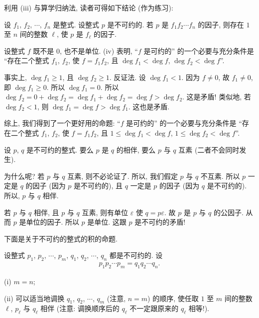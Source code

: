 \begin{remark}
    利用 (iii) 与算学归纳法, 读者可得如下结论 (作为练习):

    设 $f_1$, $f_2$, $\cdots$, $f_n$ 是整式. 设整式 $p$ 是不可约的. 若 $p$ 是 $f_1 f_2 \cdots f_n$ 的因子, 则存在 $1$ 至 $n$ 间的整数 $\ell$, 使 $p$ 是 $f_{\ell}$ 的因子.
\end{remark}

\begin{remark}
    设整式 $f$ 既不是 $0$, 也不是单位. (iv) 表明, ``$f$ 是可约的'' 的一个必要与充分条件是 ``存在二个整式 $f_1$, $f_2$, 使 $f = f_1 f_2$, 且 $\deg f_1 < \deg f$, $\deg f_2 < \deg f$''.

    事实上, $\deg f_1 \geq 1$, 且 $\deg f_2 \geq 1$. 反证法. 设 $\deg f_1 < 1$. 因为 $f \neq 0$, 故 $f_1 \neq 0$, 即 $\deg f_1 \geq 0$. 所以 $\deg f_1 = 0$. 所以 $\deg f_2 = 0 + \deg f_2 = \deg f_1 + \deg f_2 = \deg f > \deg f_2$. 这是矛盾! 类似地, 若 $\deg f_2 < 1$, 则 $\deg f_1 = \deg f > \deg f_1$. 这也是矛盾.

    综上, 我们得到了一个更好用的命题: ``$f$ 是可约的'' 的一个必要与充分条件是 ``存在二个整式 $f_1$, $f_2$, 使 $f = f_1 f_2$, 且 $1 \leq \deg f_1 < \deg f$, $1 \leq \deg f_2 < \deg f$''.
\end{remark}

\begin{remark}
    设 $p$, $q$ 是不可约的整式. 要么 $p$ 是 $q$ 的相伴, 要么 $p$ 与 $q$ 互素 (二者不会同时发生).

    为什么呢? 若 $p$ 与 $q$ 互素, 则不必论证了. 所以, 我们假定 $p$ 与 $q$ 不互素. 所以 $p$ 一定是 $q$ 的因子 (因为 $p$ 是不可约的), 且 $q$ 一定是 $p$ 的因子 (因为 $q$ 是不可约的). 所以, $p$ 与 $q$ 相伴.

    若 $p$ 与 $q$ 相伴, 且 $p$ 与 $q$ 互素, 则有单位 $\varepsilon$ 使 $q = p\varepsilon$. 故 $p$ 是 $p$ 与 $q$ 的公因子. 从而 $p$ 是单位的因子. 所以 $p$ 是单位. 这跟 $p$ 是不可约的矛盾!
\end{remark}

下面是关于不可约的整式的积的命题.

\begin{proposition}
    设整式 $p_1$, $p_2$, $\cdots$, $p_m$, $q_1$, $q_2$, $\cdots$, $q_n$ 都是不可约的. 设
    \begin{align*}
        p_1 p_2 \cdots p_m = q_1 q_2 \cdots q_n.
    \end{align*}

    (i) $m = n$;

    (ii) 可以适当地调换 $q_1$, $q_2$, $\cdots$, $q_m$ (注意, $n = m$) 的顺序, 使任取 $1$ 至 $m$ 间的整数 $\ell$, $p_{\ell}$ 与 $q_{\ell}$ 相伴 (注意: 调换顺序后的 $q_{\ell}$ 不一定跟原来的 $q_{\ell}$ 相等!).
\end{proposition}

